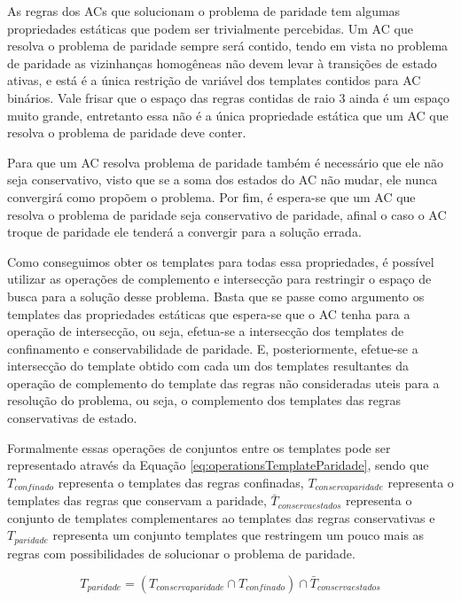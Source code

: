 \documentclass[12pt,a4paper]{article}
\begin{document}
	As regras dos ACs que solucionam o problema de paridade tem algumas propriedades estáticas que podem ser trivialmente percebidas. Um AC que resolva o problema de paridade sempre será contido, tendo em vista no problema de paridade as vizinhanças homogêneas não devem levar à transições de estado ativas, e está é a única restrição de variável dos templates contidos para AC binários. Vale frisar que o espaço das regras contidas de raio 3 ainda é um espaço muito grande, entretanto essa não é a única propriedade estática que um AC que resolva o problema de paridade deve conter.

	Para que um AC resolva problema de paridade também é necessário que ele não seja conservativo, visto que se a soma dos estados do AC não mudar, ele nunca convergirá como propõem o problema. Por fim, é espera-se que um AC que resolva o problema de paridade seja conservativo de paridade, afinal o caso o AC troque de paridade ele tenderá a convergir para a solução errada.

	Como conseguimos obter os templates para todas essa propriedades, é possível utilizar as operações de complemento e intersecção para restringir o espaço de busca para a solução desse problema. Basta que se passe como argumento os templates das propriedades estáticas que espera-se que o AC tenha para a operação de intersecção, ou seja, efetua-se a intersecção dos templates de confinamento e conservabilidade de paridade. E, posteriormente, efetue-se a intersecção do template obtido com cada um dos templates resultantes da operação de complemento do template das regras não consideradas uteis para a resolução do problema, ou seja, o complemento dos templates das regras conservativas de estado.

	Formalmente essas operações de conjuntos entre os templates pode ser representado através da Equação \ref{eq:operationsTemplateParidade}, sendo que $T_{confinado}$ representa o templates das regras confinadas, $T_{conservaparidade}$ representa o templates das regras que conservam a paridade, $\bar{T}_{conservaestados}$ representa o conjunto de templates complementares ao templates das regras conservativas e $T_{paridade}$ representa um conjunto templates que restringem um pouco mais as regras com possibilidades de solucionar o problema de paridade.

	\begin{equation}
	T_{paridade} = (T_{conservaparidade} \cap T_{confinado}) \cap \bar{T}_{conservaestados}
	\label{eq:operationsTemplateParidade}
	\end{equation}
\end{document}

